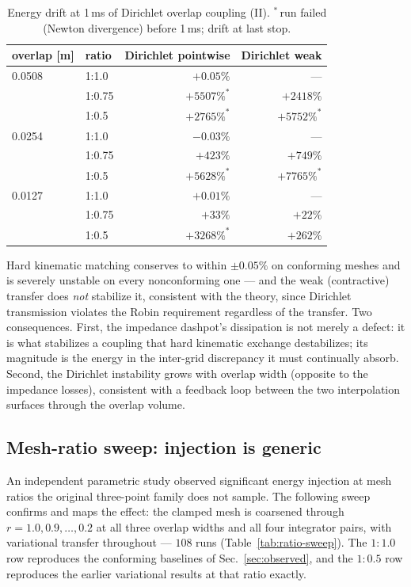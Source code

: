 \documentclass[11pt]{article}
\begin{document}
\begin{table}[htbp]
\centering
\caption{Energy drift at 1\,ms of Dirichlet overlap coupling (II).
$^{*}$\,run failed (Newton divergence) before 1\,ms; drift at last stop.}
\label{tab:dbc}
\begin{tabular}{llrr}
\toprule
overlap [m] & ratio & Dirichlet pointwise & Dirichlet weak \\
\midrule
0.0508 & 1:1.0 & $+0.05\%$ & --- \\
       & 1:0.75 & $+5507\%^{*}$ & $+2418\%$ \\
       & 1:0.5 & $+2765\%^{*}$ & $+5752\%^{*}$ \\
0.0254 & 1:1.0 & $-0.03\%$ & --- \\
       & 1:0.75 & $+423\%$ & $+749\%$ \\
       & 1:0.5 & $+5628\%^{*}$ & $+7765\%^{*}$ \\
0.0127 & 1:1.0 & $+0.01\%$ & --- \\
       & 1:0.75 & $+33\%$ & $+22\%$ \\
       & 1:0.5 & $+3268\%^{*}$ & $+262\%$ \\
\bottomrule
\end{tabular}
\end{table}

Hard kinematic matching conserves to within $\pm 0.05\%$ on conforming
meshes
and is severely unstable on every nonconforming one --- and the weak
(contractive) transfer does \emph{not} stabilize it, consistent with the
theory, since Dirichlet transmission violates the Robin requirement
regardless of the transfer. Two consequences. First, the impedance dashpot's
dissipation is not merely a defect: it is what stabilizes a coupling that
hard kinematic exchange destabilizes; its magnitude is the energy in the
inter-grid discrepancy it must continually absorb. Second, the Dirichlet
instability grows with overlap width (opposite to the impedance losses),
consistent with a feedback loop between the two interpolation surfaces
through the overlap volume.

\subsection{Mesh-ratio sweep: injection is generic}
\label{sec:ratiosweep}

An independent parametric study observed significant energy injection at
mesh ratios the original three-point family does not sample. The following
sweep confirms and maps the effect: the clamped mesh is coarsened through
$r = 1.0, 0.9, \dots, 0.2$ at all three overlap widths and all four
integrator pairs, with variational transfer throughout --- $108$ runs
(Table~\ref{tab:ratio-sweep}). The $1{:}1.0$ row reproduces the conforming
baselines of Sec.~\ref{sec:observed}, and the $1{:}0.5$ row reproduces the
earlier variational results at that ratio exactly.
\end{document}
